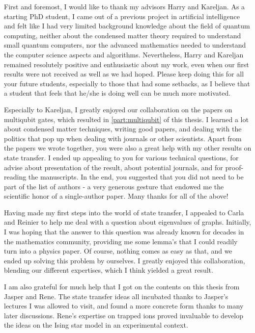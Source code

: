 
%
%


First and foremost, I would like to thank my advisors Harry and Kareljan. As a starting PhD student, I came out of a previous project in artificial intelligence and felt like I had very limited background knowledge about the field of quantum computing, neither about the condensed matter theory required to understand small quantum computers, nor the advanced mathematics needed to understand the computer science aspects and algorithms. Nevertheless, Harry and Kareljan remained resolutely positive and enthusiastic about my work, even when our first results were not received as well as we had hoped. 
%
Please keep doing this for all your future students, especially to those that had some setbacks, as I believe that a student that feels that he/she is doing well can be much more motivated. 

Especially to Kareljan, I greatly enjoyed our collaboration on the papers on multiqubit gates, which resulted in \cref{part:multiqubit} of this thesis. I learned a lot about condensed matter techniques, writing good papers, and dealing with the politics that pop up when dealing with journals or other scientists. 
Apart from the papers we wrote together, you were also a great help with my other results on state transfer. I ended up appealing to you for various technical questions, for advise about presentation of the result, about potential journals, and for proof-reading the manuscripts. In the end, you suggested that you did not need to be part of the list of authors - a very generous gesture that endowed me the scientific honor of a single-author paper. Many thanks for all of the above!

Having made my first steps into the world of state transfer, I appealed to Carla and Reinier to help me deal with a question about eigenvalues of graphs. Initially, I was hoping that the answer to this question was already known for decades in the mathematics community, providing me some lemma's that I could readily turn into a physics paper. Of course, nothing comes as easy as that, and we ended up solving this problem by ourselves. I greatly enjoyed this collaboration, blending our different expertises, which I think yielded a great result. 

I am also grateful for much help that I got on the contents on this thesis from Jasper and Rene. The state transfer ideas all incubated thanks to Jasper's lectures I was allowed to visit, and found a more concrete form thanks to many later discussions. Rene's expertise on trapped ions proved invaluable to develop the ideas on the Ising star model in an experimental context. 

